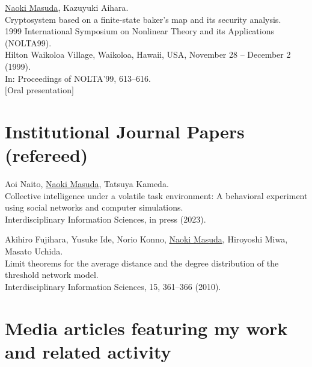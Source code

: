 \documentclass[11pt,letter]{article}
\begin{document}
\begin{etaremune}
\item \underline{Naoki Masuda}, Kazuyuki Aihara.\\
Cryptosystem based on a finite-state baker's map and its security analysis.\\
1999 International Symposium on Nonlinear Theory and its Applications (NOLTA99).\\
Hilton Waikoloa Village, Waikoloa, Hawaii, USA, November 28 -- December 2 (1999).\\
In: Proceedings of NOLTA'99, 613--616.\\
$[$Oral presentation$]$

\end{etaremune}

\section*{\bf \normalsize Institutional Journal Papers (refereed)}

\begin{etaremune}

\item Aoi Naito, \underline{Naoki Masuda}, Tatsuya Kameda.\\
Collective intelligence under a volatile task environment: A behavioral experiment using social networks and computer simulations.\\
Interdisciplinary Information Sciences, in press (2023).

\item Akihiro Fujihara, Yusuke Ide, Norio Konno, \underline{Naoki Masuda}, Hiroyoshi Miwa, Masato Uchida.\\
Limit theorems for the average distance and the degree distribution of the threshold network model.\\
Interdisciplinary Information Sciences, 15, 361--366 (2010).

\end{etaremune}

\section*{\bf \normalsize Media articles featuring my work and related activity}
\end{document}
